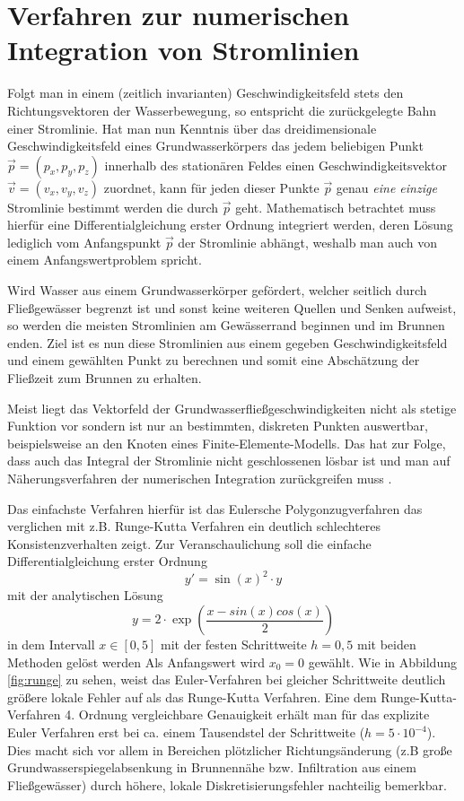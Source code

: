\section{Verfahren zur numerischen Integration von Stromlinien}
Folgt man in einem (zeitlich invarianten) Geschwindigkeitsfeld stets den Richtungsvektoren der Wasserbewegung, so entspricht die zurückgelegte Bahn einer Stromlinie. Hat man nun Kenntnis über das dreidimensionale Geschwindigkeitsfeld eines Grundwasserkörpers das jedem beliebigen Punkt $\vec{p} = (p_x, p_y, p_z)$ innerhalb des stationären Feldes einen Geschwindigkeitsvektor $\vec{v} = (v_x, v_y, v_z)$ zuordnet, kann für jeden dieser Punkte $\vec{p}$ genau \emph{eine einzige} Stromlinie bestimmt werden die durch $\vec{p}$ geht. Mathematisch betrachtet muss hierfür eine Differentialgleichung erster Ordnung integriert werden, deren Lösung lediglich vom Anfangspunkt $\vec{p}$ der Stromlinie abhängt, weshalb man auch von einem  Anfangswertproblem spricht. 

Wird Wasser aus einem Grundwasserkörper gefördert, welcher seitlich durch Fließgewässer begrenzt ist und sonst keine weiteren Quellen und Senken aufweist, so werden die meisten Stromlinien am Gewässerrand beginnen und im Brunnen enden. Ziel ist es nun diese Stromlinien aus einem gegeben Geschwindigkeitsfeld und einem gewählten Punkt zu berechnen und somit eine Abschätzung der Fließzeit zum Brunnen zu erhalten. 

Meist liegt das Vektorfeld der Grundwasserfließgeschwindigkeiten nicht als stetige Funktion vor sondern ist nur an bestimmten, diskreten Punkten auswertbar, beispielsweise an den Knoten eines Finite-Elemente-Modells. Das hat zur Folge, dass auch das Integral der Stromlinie nicht geschlossenen lösbar ist und man auf Näherungsverfahren der numerischen Integration zurückgreifen muss \cite{papula}.

Das einfachste Verfahren hierfür ist das Eulersche Polygonzugverfahren das verglichen mit z.B. Runge-Kutta Verfahren ein deutlich schlechteres Konsistenzverhalten zeigt. Zur Veranschaulichung soll die einfache Differentialgleichung erster Ordnung
\begin{equation*}
  y'= \sin(x)^2 \cdot y
\end{equation*}
mit der analytischen Lösung
\begin{equation*}
  y = 2 \cdot \exp\left({\frac{x - sin(x) cos(x)}{2}}\right)
\end{equation*}
in dem Intervall $x \in [0, 5]$ mit der festen Schrittweite $h=0,5$ mit beiden Methoden gelöst werden Als Anfangswert wird $x_0=0$ gewählt. Wie in Abbildung \ref{fig:runge} zu sehen, weist das Euler-Verfahren bei gleicher Schrittweite deutlich größere lokale Fehler auf als das Runge-Kutta Verfahren. Eine dem Runge-Kutta-Verfahren 4. Ordnung vergleichbare Genauigkeit erhält man für das explizite Euler Verfahren erst bei ca. einem Tausendstel der Schrittweite ($h=5\cdot 10^{-4}$).  Dies macht sich vor allem in Bereichen plötzlicher Richtungsänderung (z.B große Grundwasserspiegelabsenkung in Brunnennähe bzw. Infiltration aus einem Fließgewässer) durch höhere, lokale Diskretisierungsfehler nachteilig bemerkbar. 

